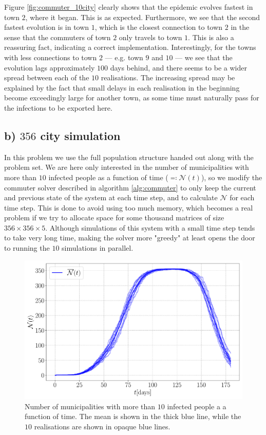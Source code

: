 Figure \ref{fig:commuter_10city} clearly shows that the epidemic evolves fastest in town $2$, where it began. This is as expected. Furthermore, we see that the second fastest evolution is in town $1$, which is the closest connection to town $2$ in the sense that the commuters of town $2$ only travels to town $1$. This is also a reassuring fact, indicating a correct implementation. Interestingly, for the towns with less connections to town $2$ --- e.g. town $9$ and $10$ --- we see that the evolution lags approximately $100$ days behind, and there seems to be a wider spread between each of the $10$ realisations. The increasing spread may be explained by the fact that small delays in each realisation in the beginning become exceedingly large for another town, as some time must naturally pass for the infections to be exported here.

\subsection{b) $356$ city simulation}

In this problem we use the full population structure handed out along with the problem set. We are here only interested in the number of municipalities with more than $10$ infected people as a function of time ($\eqqcolon \mathcal{N}(t)$), so we modify the commuter solver described in algorithm \ref{alg:commuter} to only keep the current and previous state of the system at each time step, and to calculate $\mathcal{N}$ for each time step. This is done to avoid using too much memory, which becomes a real problem if we try to allocate space for some thousand matrices of size $356 \times 356 \times 5$. Although simulations of this system with a small time step tends to take very long time, making the solver more "greedy" at least opens the door to running the $10$ simulations in parallel. 

\begin{figure}[htb]
	\centering
	\includegraphics[width=0.9\columnwidth]{../fig/2Eb_N.pdf}
	\caption{Number of municipalities with more than $10$ infected people a a function of time. The mean is shown in the thick blue line, while the $10$ realisations are shown in opaque blue lines.}
	\label{fig:infected_Eb}
\end{figure}

